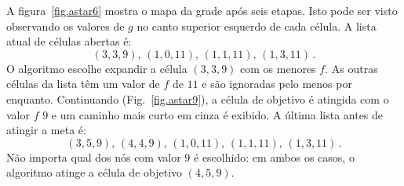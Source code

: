 
A figura~\ref{fig.astar6} mostra o mapa da grade após seis etapas. Isto pode ser visto observando os valores de $g$ no canto superior esquerdo de cada célula. A lista atual de células abertas é:
\[
(3,3,9),\, (1,0,11),\, (1,1,11),\, (1,3,11)\,.
\]
O algoritmo \astar{} escolhe expandir a célula $(3,3,9)$ com os menores $f$. As outras células da lista têm um valor de $f$ de $11$ e são ignoradas pelo menos por enquanto. Continuando (Fig.~\ref{fig.astar9}), a célula de objetivo é atingida com o valor $f$ $9$ e um caminho mais curto em cinza é exibido. A última lista antes de atingir a meta é:
\[
(3,5,9),\, (4,4,9),\, (1,0,11),\, (1,1,11),\, (1,3,11)\,.
\]
Não importa qual dos nós com valor $9$ é escolhido: em ambos os casos, o algoritmo atinge a célula de objetivo $(4,5,9)$.

